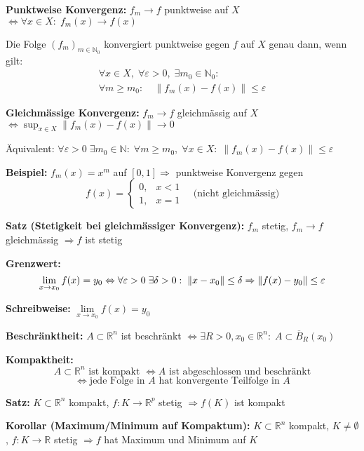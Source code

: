 \begin{itemize}
\textbf{Punktweise Konvergenz:}  
\(f_m \to f\) punktweise auf \(X\)  
\(\Leftrightarrow \forall x \in X:\; f_m(x) \to f(x)\)

Die Folge $(f_m)_{m \in \mathbb{N}_0}$ konvergiert punktweise gegen $f$ auf $X$ genau dann, wenn gilt:
\[
\begin{aligned}
\forall x \in X,\; \forall \varepsilon > 0,\; \exists m_0 \in \mathbb{N}_0:\; \\
\forall m \ge m_0:\quad \|f_m(x) - f(x)\| \le \varepsilon
\end{aligned}
\]

\textbf{Gleichmässige Konvergenz:}  
\(f_m \to f\) gleichmässig auf \(X\)  
\(\Leftrightarrow \sup_{x \in X} \|f_m(x) - f(x)\| \to 0\)

Äquivalent:  
\(\forall \varepsilon > 0\; \exists m_0 \in \mathbb{N}:\; \forall m \ge m_0,\; \forall x \in X:\; \|f_m(x) - f(x)\| \le \varepsilon\)

\textbf{Beispiel:} \(f_m(x) = x^m\) auf \([0,1] \Rightarrow\) punktweise Konvergenz gegen  
\[
f(x) = \begin{cases}
0, & x < 1 \\
1, & x = 1
\end{cases}
\quad \text{(nicht gleichmässig)}
\]

\textbf{Satz (Stetigkeit bei gleichmässiger Konvergenz):}  
\(f_m\) stetig,\; \(f_m \to f\) gleichmässig \(\Rightarrow f\) ist stetig


\textbf{Grenzwert:}  
\[
\lim_{x \to x_0} f(x) = y_0 \Leftrightarrow
\forall \varepsilon > 0\; \exists \delta > 0:\;
\|x - x_0\| \leq \delta \Rightarrow \\
\|f(x) - y_0\| \leq \varepsilon
\]

\textbf{Schreibweise:}  
\( \lim\limits_{x \to x_0} f(x) = y_0 \)

\textbf{Beschränktheit:}  
\(A \subset \mathbb{R}^n\) ist beschränkt \(\Leftrightarrow \exists R > 0, x_0 \in \mathbb{R}^n:\; A \subset \overline{B}_R(x_0)\)

\textbf{Kompaktheit:}  
\[
A \subset \mathbb{R}^n \text{ ist kompakt } \Leftrightarrow A \text{ ist abgeschlossen und beschränkt}
\]
\[
\Leftrightarrow \text{jede Folge in } A \text{ hat konvergente Teilfolge in } A
\]

\textbf{Satz:}  
\(K \subset \mathbb{R}^n\) kompakt,\; \(f: K \to \mathbb{R}^p\) stetig  
\(\Rightarrow f(K)\) ist kompakt

\textbf{Korollar (Maximum/Minimum auf Kompaktum):}  
\(K \subset \mathbb{R}^n\) kompakt, \(K \ne \emptyset\), \(f: K \to \mathbb{R}\) stetig  
\(\Rightarrow f\) hat Maximum und Minimum auf \(K\)


\end{itemize}
